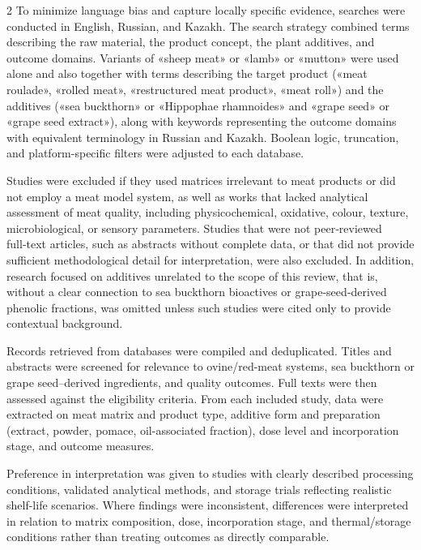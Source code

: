 \begin{multicols}{2}
To minimize language bias and capture locally specific evidence,
searches were conducted in English, Russian, and Kazakh. The search
strategy combined terms describing the raw material, the product
concept, the plant additives, and outcome domains. Variants of «sheep
meat» or «lamb» or «mutton» were used alone and also together with terms
describing the target product («meat roulade», «rolled meat»,
«restructured meat product», «meat roll») and the additives («sea
buckthorn» or «Hippophae rhamnoides» and «grape seed» or «grape seed
extract»), along with keywords representing the outcome domains with
equivalent terminology in Russian and Kazakh. Boolean logic, truncation,
and platform-specific filters were adjusted to each database.

Studies were excluded if they used matrices irrelevant to meat products
or did not employ a meat model system, as well as works that lacked
analytical assessment of meat quality, including physicochemical,
oxidative, colour, texture, microbiological, or sensory parameters.
Studies that were not peer‑reviewed full‑text articles, such as
abstracts without complete data, or that did not provide sufficient
methodological detail for interpretation, were also excluded. In
addition, research focused on additives unrelated to the scope of this
review, that is, without a clear connection to sea buckthorn bioactives
or grape‑seed‑derived phenolic fractions, was omitted unless such
studies were cited only to provide contextual background.

Records retrieved from databases were compiled and deduplicated. Titles
and abstracts were screened for relevance to ovine/red-meat systems, sea
buckthorn or grape seed--derived ingredients, and quality outcomes. Full
texts were then assessed against the eligibility criteria. From each
included study, data were extracted on meat matrix and product type,
additive form and preparation (extract, powder, pomace, oil-associated
fraction), dose level and incorporation stage, and outcome measures.

Preference in interpretation was given to studies with clearly described
processing conditions, validated analytical methods, and storage trials
reflecting realistic shelf-life scenarios. Where findings were
inconsistent, differences were interpreted in relation to matrix
composition, dose, incorporation stage, and thermal/storage conditions
rather than treating outcomes as directly comparable.


\end{multicols}
